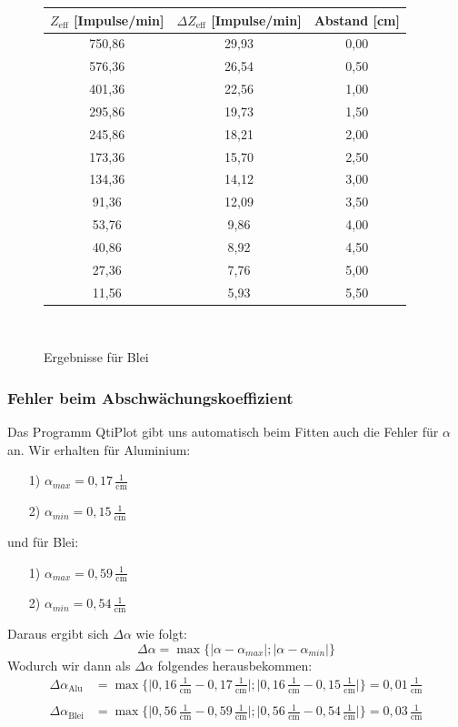 \documentclass[fontsize=12pt]{scrartcl}
\begin{document}
\begin{figure}[h!]
\centering
\caption{Ergebnisse  für Blei}
\begin{tabular}{|c|c|c|} \hline
$Z_{\text{eff}}$ [Impulse/min] & $\Delta Z_{\text{eff}}$ [Impulse/min]	&Abstand [cm] \\ \hline
750,86	&29,93	&0,00\\ \hline
576,36	&26,54	&0,50\\ \hline
401,36	&22,56	&1,00\\ \hline
295,86	&19,73	&1,50\\ \hline
245,86	&18,21	&2,00\\ \hline
173,36	&15,70	&2,50\\ \hline
134,36	&14,12	&3,00\\ \hline
91,36	&12,09	&3,50\\ \hline
53,76	&9,86	&4,00\\ \hline
40,86	&8,92	&4,50\\ \hline
27,36	&7,76	&5,00\\ \hline
11,56	&5,93	&5,50\\ \hline
\end{tabular} \\
\end{figure}

\subsubsection{Fehler beim Abschwächungskoeffizient}

Das Programm QtiPlot gibt uns automatisch beim Fitten auch die Fehler für $\alpha$ an.
Wir erhalten für Aluminium:
\begin{itemize}
\item[1)] $\alpha_{max}=0,17\,\frac{1}{\text{cm}}$
\item[2)] $\alpha_{min}=0,15\,\frac{1}{\text{cm}}$
\end{itemize}
und für Blei:
\begin{itemize}
\item[1)] $\alpha_{max}=0,59\,\frac{1}{\text{cm}}$
\item[2)] $\alpha_{min}=0,54\,\frac{1}{\text{cm}}$
\end{itemize}
\newpage
\noindent
Daraus ergibt sich $\Delta \alpha$ wie folgt:
\begin{equation*}
\Delta \alpha = \max\{ \vert \alpha - \alpha_{max}\vert ; \vert \alpha - \alpha_{min}\vert \}
\end{equation*}
Wodurch wir dann als $\Delta \alpha$ folgendes herausbekommen:
\begin{align*}
\Delta \alpha_{\text{Alu}} &= \max\{ \vert 0,16\,\frac{1}{\text{cm}} - 0,17\,\frac{1}{\text{cm}}\vert ; \vert 0,16\,\frac{1}{\text{cm}} - 0,15\,\frac{1}{\text{cm}}\vert \} = 0,01\,\frac{1}{\text{cm}} \\
~\\
\Delta \alpha_{\text{Blei}} &= \max\{ \vert 0,56\,\frac{1}{\text{cm}} - 0,59\,\frac{1}{\text{cm}}\vert ; \vert 0,56\,\frac{1}{\text{cm}} - 0,54\,\frac{1}{\text{cm}}\vert \} = 0,03\,\frac{1}{\text{cm}} 
\end{align*}
\end{document}
